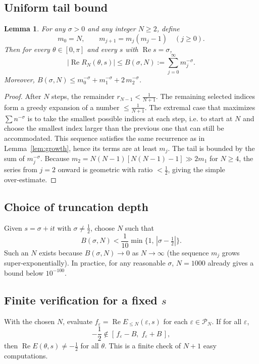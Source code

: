 \documentclass[11pt,a4paper]{article}
\newtheorem{lemma}[theorem]{Lemma}
\theoremstyle{definition}
\theoremstyle{remark}
\begin{document}
\subsection{Uniform tail bound}
\begin{lemma}\label{lem:tail}
For any \(\sigma>0\) and any integer \(N\ge 2\), define
\[
m_0 = N,\qquad m_{j+1} = m_j(m_j-1)\quad (j\ge 0).
\]
Then for every \(\theta\in[0,\pi]\) and every \(s\) with \(\operatorname{Re}s=\sigma\),
\[
|\operatorname{Re}R_N(\theta,s)| \le B(\sigma,N) := \sum_{j=0}^{\infty} m_j^{-\sigma}.
\tag{7}
\]
Moreover, \(B(\sigma,N)\le m_0^{-\sigma}+m_1^{-\sigma}+2\,m_2^{-\sigma}\).
\end{lemma}
\begin{proof}
After \(N\) steps, the remainder \(r_{N-1}<\frac{1}{N+1}\).  The remaining selected indices form a greedy expansion of a number \(\le \frac{1}{N+1}\).  The extremal case that maximizes \(\sum n^{-\sigma}\) is to take the smallest possible indices at each step, i.e. to start at \(N\) and choose the smallest index larger than the previous one that can still be accommodated.  This sequence satisfies the same recurrence as in Lemma~\ref{lem:growth}, hence its terms are at least \(m_j\).  The tail is bounded by the sum of \(m_j^{-\sigma}\).  Because \(m_2 = N(N-1)[N(N-1)-1] \gg 2m_1\) for \(N\ge 4\), the series from \(j=2\) onward is geometric with ratio \(<\frac12\), giving the simple over‑estimate.
\end{proof}

\subsection{Choice of truncation depth}
Given \(s=\sigma+it\) with \(\sigma\neq\frac12\), choose \(N\) such that
\[
B(\sigma,N) < \frac{1}{10} \min\bigl\{1,\, |\sigma-\tfrac12|\bigr\}.
\tag{8}
\]
Such an \(N\) exists because \(B(\sigma,N)\to 0\) as \(N\to\infty\) (the sequence \(m_j\) grows super‑exponentially).  In practice, for any reasonable \(\sigma\), \(N=1000\) already gives a bound below \(10^{-100}\).

\subsection{Finite verification for a fixed \(s\)}
With the chosen \(N\), evaluate \(f_\varepsilon = \operatorname{Re}E_{\le N}(\varepsilon,s)\) for each \(\varepsilon\in\mathcal{P}_N\).  If for all \(\varepsilon\),
\[
-\frac12 \notin [\,f_\varepsilon - B,\; f_\varepsilon + B\,],
\tag{9}
\]
then \(\operatorname{Re}E(\theta,s)\neq -\frac12\) for all \(\theta\).  This is a finite check of \(N+1\) easy computations.
\end{document}

